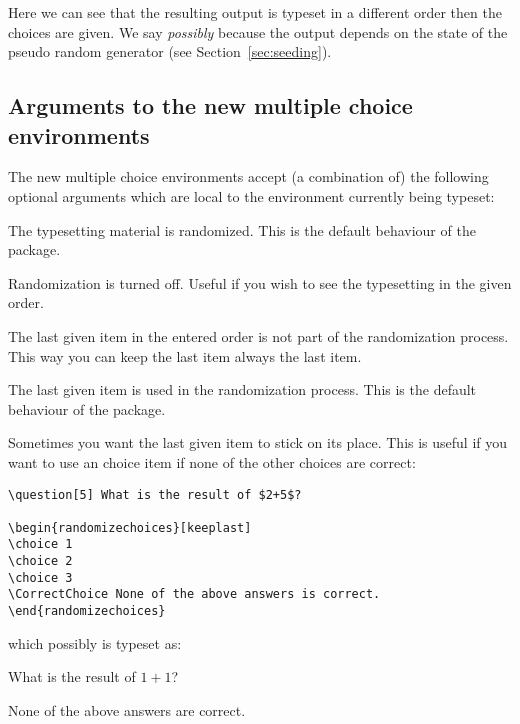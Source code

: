 \documentclass[12pt,a4paper]{exam}
\begin{document}
Here we can see that the resulting output is typeset in a different order
then the choices are given. We say \emph{possibly} because the output
depends on the state of the pseudo random generator (see Section~\ref{sec:seeding}).

\subsection{Arguments to the new multiple choice environments}
The new multiple choice environments accept (a combination of) the following optional arguments
which are local to the environment currently being typeset:

\begin{description}[labelindent=2ex]
\item[randomize] The typesetting material is randomized. This is the default
behaviour of the package.
\item[norandomize] Randomization is turned off.
Useful if you wish to see the typesetting in the given order.
\item[keeplast] The last given item in the entered order is not part of the
randomization process. This way you can keep the last item always the last item.
\item[nokeeplast] The last given item is used in the randomization process. This
is the default behaviour of the package.

\end{description}

Sometimes you want the last given item to stick on its place. This is useful
if you want to use an choice item if none of the other choices are correct:

\begin{lstlisting}
\question[5] What is the result of $2+5$?

\begin{randomizechoices}[keeplast]
\choice 1
\choice 2
\choice 3
\CorrectChoice None of the above answers is correct.
\end{randomizechoices}
\end{lstlisting}

which possibly is typeset as:

\begin{questions}
\setcounter{question}{7}
\question[5] What is the result of $1+1$?

\begin{randomizechoices}[keeplast]
\CorrectChoice None of the above answers are correct.
\end{randomizechoices}
\end{questions}
\end{document}
